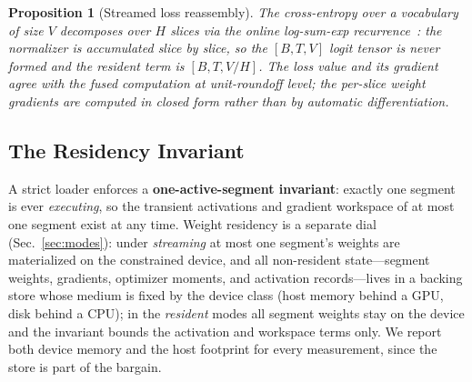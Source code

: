 \documentclass[journal]{IEEEtran}
\newtheorem{proposition}{Proposition}
\begin{document}
\begin{proposition}[Streamed loss reassembly]\label{prop:lse}
The cross-entropy over a vocabulary of size $V$ decomposes over $H$ slices via
the online log-sum-exp recurrence~\cite{milakov2018online}: the normalizer is
accumulated slice by slice, so the $[B,T,V]$ logit tensor is never formed and
the resident term is $[B,T,V/H]$. The loss value and its gradient agree with
the fused computation at unit-roundoff level; the per-slice weight gradients
are computed in closed form rather than by automatic differentiation.
\end{proposition}

\subsection{The Residency Invariant}\label{sec:invariant}
A strict loader enforces a \textbf{one-active-segment invariant}: exactly
one segment is ever \emph{executing}, so the transient activations and
gradient workspace of at most one segment exist at any time. Weight
residency is a separate dial (Sec.~\ref{sec:modes}): under \emph{streaming}
at most one segment's weights are materialized on the constrained device,
and all non-resident state---segment weights, gradients, optimizer moments,
and activation records---lives in a backing store whose medium is fixed by
the device class (host memory behind a GPU, disk behind a CPU); in the
\emph{resident} modes all segment weights stay on the device and the
invariant bounds the activation and workspace terms only. We report both
device memory and the host footprint for every measurement, since the store
is part of the bargain.
\end{document}
